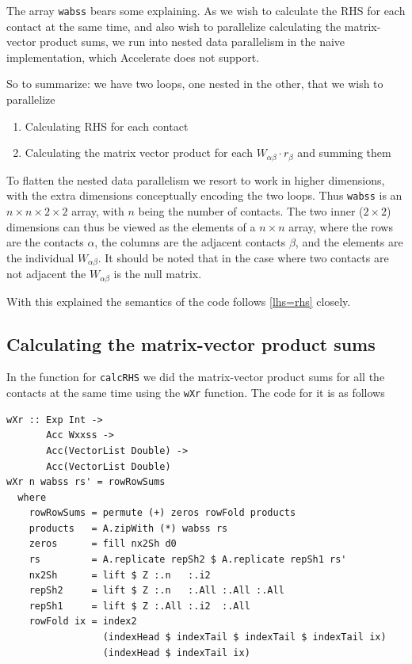 \documentclass[runningheads,a4paper]{llncs}
\begin{document}
The array \texttt{wabss} bears some explaining.
As we wish to calculate the RHS for each contact at the same time,
and also wish to parallelize calculating the matrix-vector product sums,
we run into nested data parallelism in the naive implementation,
which Accelerate does not support.

So to summarize: we have two loops, one nested in the other, that we wish to parallelize
\begin{enumerate}
\item Calculating RHS for each contact
\item Calculating the matrix vector product for each $W_{\alpha\beta} \cdot r_{\beta}$ and summing them
\end{enumerate}

To flatten the nested data parallelism we resort to work in higher dimensions,
with the extra dimensions conceptually encoding the two loops.
Thus \texttt{wabss} is an $n \times n \times 2 \times 2$ array,
with $n$ being the number of contacts.
The two inner ($2 \times 2$) dimensions can thus be viewed
as the elements of a $n \times n$ array,
where the rows are the contacts $\alpha$,
the columns are the adjacent contacts $\beta$,
and the elements are the individual $W_{\alpha\beta}$.
It should be noted that in the case where two contacts are not adjacent
the $W_{\alpha\beta}$ is the null matrix.

With this explained the semantics of the code follows \eqref{lhs=rhs} closely.

\subsection{Calculating the matrix-vector product sums}
In the function for \texttt{calcRHS} we did the matrix-vector product sums
for all the contacts at the same time using the \texttt{wXr} function.
The code for it is as follows
\begin{verbatim}
wXr :: Exp Int ->
       Acc Wxxss ->
       Acc(VectorList Double) ->
       Acc(VectorList Double)
wXr n wabss rs' = rowRowSums
  where
    rowRowSums = permute (+) zeros rowFold products
    products   = A.zipWith (*) wabss rs
    zeros      = fill nx2Sh d0
    rs         = A.replicate repSh2 $ A.replicate repSh1 rs'
    nx2Sh      = lift $ Z :.n   :.i2
    repSh2     = lift $ Z :.n   :.All :.All :.All
    repSh1     = lift $ Z :.All :.i2  :.All
    rowFold ix = index2
                 (indexHead $ indexTail $ indexTail $ indexTail ix)
                 (indexHead $ indexTail ix)
\end{verbatim}
\end{document}
